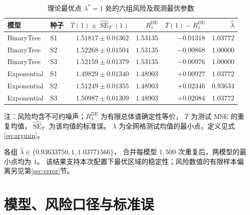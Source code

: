 \documentclass[UTF8,fontset=fandol,a4paper,zihao=-4]{ctexart}
\DeclareMathOperator{\SE}{SE}
\newcommand{\Tbar}{\overline T}
\numberwithin{equation}{section}
\begin{document}
\begin{table}[htbp]
 \centering\small
 \caption{理论最优点 $\lambda^*=1$ 处的六组风险及观测最优参数}
 \label{tab:main}
 \setlength{\tabcolsep}{4.2pt}\renewcommand{\arraystretch}{1.16}
 \begin{tabular}{llrrrr}
 \toprule
 模型 & 种子 & $\Tbar(1)\pm\widehat{\SE}_T(1)$
 & $R_1^{\mathrm{DE}}$ & $\Tbar(1)-R_1^{\mathrm{DE}}$ & $\widehat\lambda$\\
 \midrule
 BinaryTree & S1 & $1.51817\pm 0.01362$ & $1.53135$ & $-0.01318$ & $1.03772$ \\
BinaryTree & S2 & $1.52268\pm 0.01504$ & $1.53135$ & $-0.00868$ & $1.00000$ \\
BinaryTree & S3 & $1.52159\pm 0.01379$ & $1.53135$ & $-0.00976$ & $1.00000$ \\
Exponential & S1 & $1.49829\pm 0.01340$ & $1.48903$ & $+0.00927$ & $1.03772$ \\
Exponential & S2 & $1.51249\pm 0.01355$ & $1.48903$ & $+0.02346$ & $0.93634$ \\
Exponential & S3 & $1.50987\pm 0.01309$ & $1.48903$ & $+0.02084$ & $1.03772$ \\
 \bottomrule
 \end{tabular}
 \par\vspace{3pt}
 \begin{minipage}{0.98\textwidth}\footnotesize
 注：风险均含不可约噪声；$R_\lambda^{\mathrm{DE}}$ 为有限总体谱确定性等价，
 $\Tbar$ 为测试 MSE 的重复均值，$\widehat{\SE}_T$ 为该均值的标准误。
 $\widehat\lambda$ 为全网格测试均值的最小点，定义见式\eqref{eq:argmin}。
 \end{minipage}
\end{table}

各组 $\widehat\lambda\in\{0.93633750,1,1.03771566\}$，
合并每模型 $1{,}500$ 次重复后，两模型的最小点均为 $1$。
该结果支持本次配置下最优区域的稳定性；风险数值的有限样本偏离另见第\ref{sec:error}节。

\clearpage
\section{模型、风险口径与标准误}\label{sec:definitions}
\end{document}

